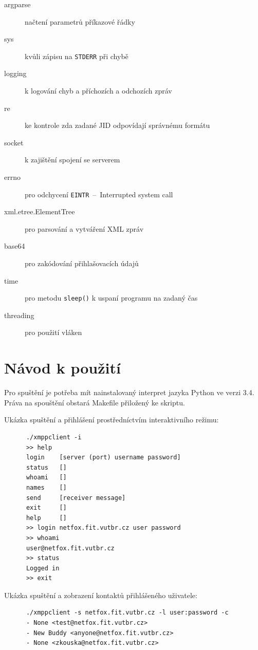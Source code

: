 \documentclass[11pt,a4paper]{article}
\begin{document}
    \begin{description}
      \item[argparse] načtení parametrů příkazové řádky
      \item[sys] kvůli zápisu na \texttt{STDERR} při chybě
      \item[logging] k logování chyb a příchozích a odchozích zpráv 
      \item[re] ke kontrole zda zadané JID odpovídají správnému formátu
      \item[socket] k zajištění spojení se serverem
      \item[errno] pro odchycení \texttt{EINTR} \,--\, Interrupted system call
      \item[xml.etree.ElementTree] pro parsování a vytváření XML zpráv
      \item[base64] pro zakódování přihlašovacích údajů
      \item[time] pro metodu \texttt{sleep()} k uspaní programu na zadaný čas
      \item[threading] pro použití vláken
    \end{description}

  \section{Návod k použití}
    
    Pro spuštění je potřeba mít nainstalovaný interpret jazyka Python ve verzi
    3.4. Práva na spouštění obstará Makefile přiložený ke skriptu.

    \noindent
    Ukázka spuštění a přihlášení prostředníctvím interaktivního režimu:
    \begin{lstlisting}
      ./xmppclient -i
      >> help 
      login    [server (port) username password]
      status   []
      whoami   []
      names    []
      send     [receiver message]
      exit     []
      help     []
      >> login netfox.fit.vutbr.cz user password
      >> whoami
      user@netfox.fit.vutbr.cz
      >> status
      Logged in
      >> exit
    \end{lstlisting}

    \noindent
    Ukázka spuštění a zobrazení kontaktů přihlášeného uživatele:
    \begin{lstlisting}
      ./xmppclient -s netfox.fit.vutbr.cz -l user:password -c
      - None <test@netfox.fit.vutbr.cz>
      - New Buddy <anyone@netfox.fit.vutbr.cz>
      - None <zkouska@netfox.fit.vutbr.cz>
    \end{lstlisting}
\end{document}
